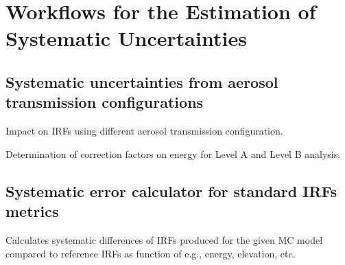 \section{Workflows for the Estimation of Systematic Uncertainties}

\subsection{Systematic uncertainties from aerosol transmission configurations}

Impact on IRFs using different aerosol transmission configuration.

Determination of correction factors on energy for Level A and Level B analysis.

\subsection{Systematic error calculator for standard IRFs metrics}

Calculates systematic differences of IRFs produced for the given MC model compared to reference IRFs as function of e.g., energy, elevation, etc.